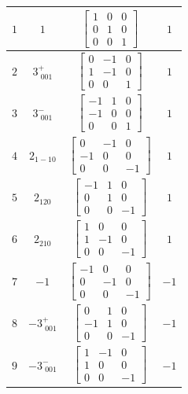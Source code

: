\documentclass[fleqn,8pt]{jsarticle}
\begin{document}
\begin{longtable}{cccc}
$ 1 $ & $ 1 $ & $ \begin{bmatrix} 1 & 0 & 0 \\ 0 & 1 & 0 \\ 0 & 0 & 1 \end{bmatrix} $ & $ 1 $ \\ \hline
$ 2 $ & $ 3^{+}_{\,\,001} $ & $ \begin{bmatrix} 0 & -1 & 0 \\ 1 & -1 & 0 \\ 0 & 0 & 1 \end{bmatrix} $ & $ 1 $ \\ \hline
$ 3 $ & $ 3^{-}_{\,\,001} $ & $ \begin{bmatrix} -1 & 1 & 0 \\ -1 & 0 & 0 \\ 0 & 0 & 1 \end{bmatrix} $ & $ 1 $ \\ \hline
$ 4 $ & $ 2{}_{1-10} $ & $ \begin{bmatrix} 0 & -1 & 0 \\ -1 & 0 & 0 \\ 0 & 0 & -1 \end{bmatrix} $ & $ 1 $ \\ \hline
$ 5 $ & $ 2{}_{120} $ & $ \begin{bmatrix} -1 & 1 & 0 \\ 0 & 1 & 0 \\ 0 & 0 & -1 \end{bmatrix} $ & $ 1 $ \\ \hline
$ 6 $ & $ 2{}_{210} $ & $ \begin{bmatrix} 1 & 0 & 0 \\ 1 & -1 & 0 \\ 0 & 0 & -1 \end{bmatrix} $ & $ 1 $ \\ \hline
$ 7 $ & $ -1 $ & $ \begin{bmatrix} -1 & 0 & 0 \\ 0 & -1 & 0 \\ 0 & 0 & -1 \end{bmatrix} $ & $ -1 $ \\ \hline
$ 8 $ & $ -3^{+}_{\,\,001} $ & $ \begin{bmatrix} 0 & 1 & 0 \\ -1 & 1 & 0 \\ 0 & 0 & -1 \end{bmatrix} $ & $ -1 $ \\ \hline
$ 9 $ & $ -3^{-}_{\,\,001} $ & $ \begin{bmatrix} 1 & -1 & 0 \\ 1 & 0 & 0 \\ 0 & 0 & -1 \end{bmatrix} $ & $ -1 $ \\ \hline

\end{longtable}
\end{document}
